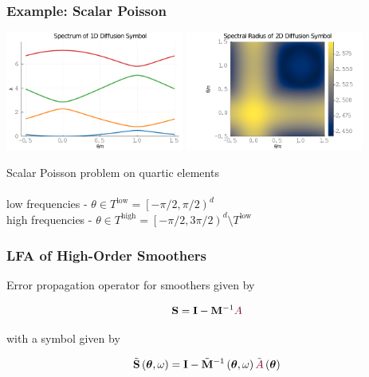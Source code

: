 \documentclass{beamer}
\begin{document}
\begin{frame}
\begin{center}
\frametitle{Example: Scalar Poisson}

\includegraphics[height=3.9cm]{../img/diffusionSymbol1D}
\includegraphics[height=3.9cm]{../img/diffusionSymbol2D}

Scalar Poisson problem on quartic elements\\

~\\

low frequencies - $\theta \in T^{\text{low}} = \left[ - \pi / 2, \pi / 2 \right)^d$\\

high frequencies - $\theta \in T^{\text{high}} = \left[ - \pi / 2, 3 \pi / 2 \right)^d \setminus T^{\text{low}}$

\end{center}
\end{frame}


\begin{frame}
\begin{center}
\frametitle{LFA of High-Order Smoothers}

Error propagation operator for smoothers given by

\begin{equation}
\mathbf{S} = \mathbf{I} - \mathbf{M}^{-1} {\color{burgundy}A}
\end{equation}

with a symbol given by

\begin{equation}
\tilde{\mathbf{S}} \left( \boldsymbol{\theta}, \omega \right) = \mathbf{I} - \tilde{\mathbf{M}}^{-1} \left( \boldsymbol{\theta}, \omega \right) \tilde{{\color{burgundy}A}} \left( \boldsymbol{\theta} \right)
\end{equation}

\end{center}
\end{frame}
\end{document}
